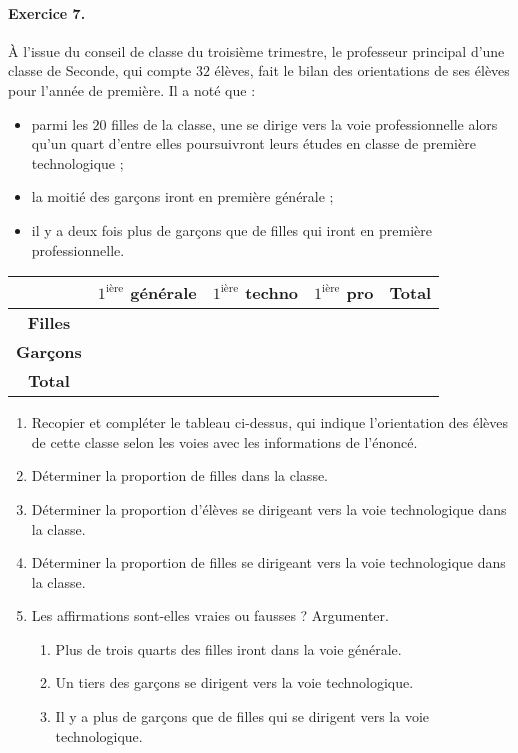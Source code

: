 \documentclass[11pt]{article}
\begin{document}
\paragraph{Exercice 7.}
À l’issue du conseil de classe du troisième trimestre, le professeur principal
d’une classe de Seconde, qui compte $32$ élèves, fait le bilan des orientations de ses élèves pour l’année de première. Il a noté que :
\begin{itemize}
  \item parmi les $20$ filles de la classe, une se dirige vers la voie
    professionnelle alors qu’un quart d’entre elles poursuivront leurs études en
    classe de première technologique ;
  \item la moitié des garçons iront en première générale ;
  \item il y a deux fois plus de garçons que de filles qui iront en première
    professionnelle.
\end{itemize}
  \begin{center}
    \def\arraystretch{1.75}
 \begin{tabular}{|c|c|c|c|c|}
   \hline
   & \textbf{$1^\text{ière}$ générale} & \textbf{$1^\text{ière}$ techno} &
   \textbf{$1^\text{ière}$ pro} &\textbf{Total} \\
   \hline
  \textbf{Filles} &  &  &  & \\
   \hline
   \textbf{Garçons} &  &  & &  \\
   \hline
  \textbf{Total} &  & & & \\
   \hline
\end{tabular}
\end{center}
\begin{enumerate}
  \item Recopier et compléter le tableau ci-dessus, qui indique l’orientation des
    élèves de cette classe selon les voies avec les informations de l’énoncé.
  \item Déterminer la proportion de filles dans la classe.
  \item Déterminer la proportion d’élèves se dirigeant vers la voie
    technologique dans la classe.
  \item Déterminer la proportion de filles se dirigeant vers la voie
    technologique dans la classe.
  \item Les affirmations sont-elles vraies ou fausses ? Argumenter.
    \begin{enumerate}
      \item Plus de trois quarts des filles iront dans la voie générale.
      \item Un tiers des garçons se dirigent vers la voie technologique.
      \item Il y a plus de garçons que de filles qui se dirigent vers la voie
        technologique.
    \end{enumerate}
\end{enumerate}
\end{document}
